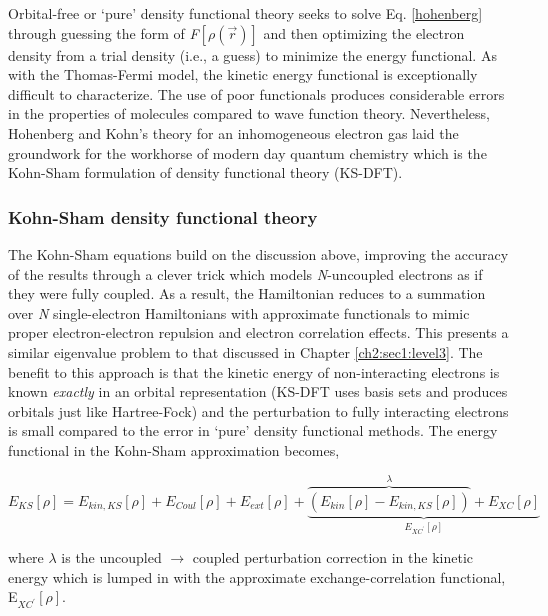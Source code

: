 \begin{theory}
  Orbital-free or `pure' density functional theory seeks to solve Eq. \ref{hohenberg} through guessing the form
  of \emph{F}$\left[\rho(\vec{r})\right]$ and then optimizing the electron density from a trial density (i.e.,
  a guess) to minimize the energy functional. As with the Thomas-Fermi model, the kinetic energy functional is
  exceptionally difficult to characterize. The use of poor functionals produces considerable errors in the 
  properties of molecules compared to wave function theory. Nevertheless, Hohenberg and Kohn's theory for an 
  inhomogeneous electron gas laid the groundwork for the workhorse of modern day quantum chemistry which is 
  the Kohn-Sham formulation of density functional theory (KS-DFT).
  
  \subsubsection{\label{ch2:sec1:level4:chasm2}Kohn-Sham density functional theory}
  The Kohn-Sham equations build on the discussion above, improving the accuracy of the results through a clever
  trick which models \emph{N}-uncoupled electrons as if they were fully coupled. As a result, the Hamiltonian 
  reduces to a summation over \emph{N} single-electron Hamiltonians with approximate functionals to mimic proper
  electron-electron repulsion and electron correlation effects. This presents a similar eigenvalue problem to 
  that discussed in Chapter \ref{ch2:sec1:level3}. The benefit to this approach is that the kinetic energy of 
  non-interacting electrons is known \emph{exactly} in an orbital representation (KS-DFT uses basis sets and 
  produces orbitals just like Hartree-Fock) and the perturbation to fully interacting electrons is small compared 
  to the error in `pure' density functional methods. The energy functional in the Kohn-Sham approximation becomes,
  
  \begin{equation}\label{ksdft}
      E_{KS}\left[\rho\right] = E_{kin,KS}\left[\rho\right] + E_{Coul}\left[\rho\right] + E_{ext}\left[\rho\right]
      + \underbrace{\overbrace{\left(E_{kin}\left[\rho\right] - E_{kin,KS}\left[\rho\right]\right)}^{\lambda} + 
      E_{XC}\left[\rho\right]}_{E_{XC^{\prime}}\left[\rho\right]}
  \end{equation}
  
  \noindent where $\lambda$ is the uncoupled $\rightarrow$ coupled perturbation correction in the kinetic energy
  which is lumped in with the approximate exchange-correlation functional, E$_{XC^{\prime}}\left[\rho\right]$.
  

\end{theory}
